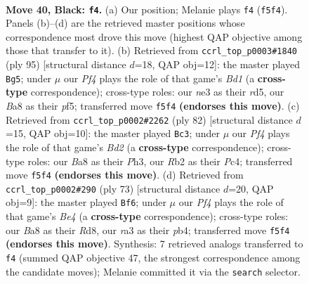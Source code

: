 \documentclass[11pt]{article}
\begin{document}
\clearpage

\begin{figure}[p]\centering
\begin{subfigure}{0.46\textwidth}\centering
\resizebox{\linewidth}{!}{%
\newchessgame
\chessboard[
  setfen={b5k1/P4p2/8/4Pp1K/8/R3N2P/1r6/8 b - - 0 40},
  showmover=false,
  pgfstyle=straightmove, color=movearrow, markmove={f5-f4}
]}
\caption{}
\end{subfigure}\hfill
\begin{subfigure}{0.46\textwidth}\centering
\resizebox{\linewidth}{!}{%
\newchessgame
\chessboard[
  setfen={3b4/7k/7p/3R1P2/p3N3/7P/r7/5K2 b - - 1 48},
  showmover=false,
  pgfstyle=straightmove, color=movearrow, markmove={d8-g5}
]}
\caption{}
\end{subfigure}
\\[4pt]
\begin{subfigure}{0.46\textwidth}\centering
\resizebox{\linewidth}{!}{%
\newchessgame
\chessboard[
  setfen={6k1/1R6/p3rpp1/8/2P5/5n1P/1P1B4/1K6 w - - 1 42},
  showmover=false,
  pgfstyle=straightmove, color=movearrow, markmove={d2-c3}
]}
\caption{}
\end{subfigure}\hfill
\begin{subfigure}{0.46\textwidth}\centering
\resizebox{\linewidth}{!}{%
\newchessgame
\chessboard[
  setfen={3r1k2/p4p2/4p3/4b3/1PR3P1/5N2/P5K1/8 b - - 1 37},
  showmover=false,
  pgfstyle=straightmove, color=movearrow, markmove={e5-f6}
]}
\caption{}
\end{subfigure}
\caption{\textbf{Move 40, Black: \texttt{f4}.} (a) Our position; Melanie plays \texttt{f4} (\texttt{f5f4}). Panels (b)--(d) are the retrieved master positions whose correspondence most drove this move (highest QAP objective among those that transfer to it). (b) Retrieved from \texttt{ccrl\_top\_p0003\#1840} (ply 95) [structural distance $d$=18, QAP obj=12]: the master played \texttt{Bg5}; under $\mu$ our \emph{Pf4} plays the role of that game's \emph{Bd1} (a \textbf{cross-type} correspondence); cross-type roles: our \emph{n}e3 as their \emph{r}d5, our \emph{B}a8 as their \emph{p}f5; transferred move \texttt{f5f4} \textbf{(endorses this move)}. (c) Retrieved from \texttt{ccrl\_top\_p0002\#2262} (ply 82) [structural distance $d$=15, QAP obj=10]: the master played \texttt{Bc3}; under $\mu$ our \emph{Pf4} plays the role of that game's \emph{Bd2} (a \textbf{cross-type} correspondence); cross-type roles: our \emph{B}a8 as their \emph{P}h3, our \emph{R}b2 as their \emph{P}c4; transferred move \texttt{f5f4} \textbf{(endorses this move)}. (d) Retrieved from \texttt{ccrl\_top\_p0002\#290} (ply 73) [structural distance $d$=20, QAP obj=9]: the master played \texttt{Bf6}; under $\mu$ our \emph{Pf4} plays the role of that game's \emph{Be4} (a \textbf{cross-type} correspondence); cross-type roles: our \emph{B}a8 as their \emph{R}d8, our \emph{r}a3 as their \emph{p}b4; transferred move \texttt{f5f4} \textbf{(endorses this move)}. Synthesis: 7 retrieved analogs transferred to \texttt{f4} (summed QAP objective 47, the strongest correspondence among the candidate moves); Melanie committed it via the \texttt{search} selector.}
\label{fig:thought-m79}
\end{figure}
\end{document}
